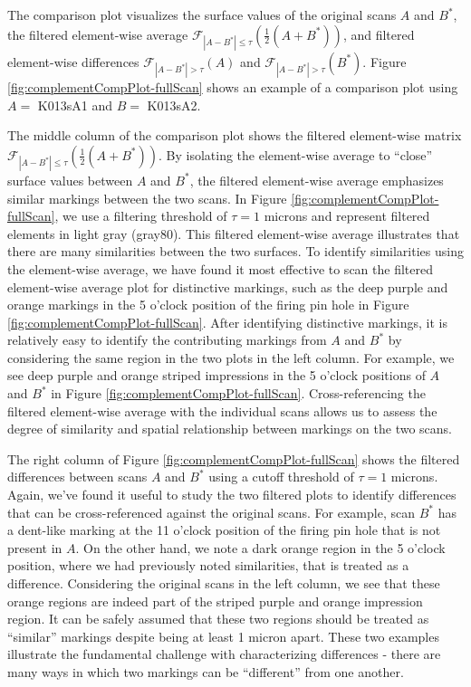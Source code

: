 \documentclass[11pt,]{isuthesis}
\begin{document}
The comparison plot visualizes the surface values of the original scans \(A\) and \(B^*\), the filtered element-wise average \(\mathcal{F}_{|A - B^*| \leq \tau}\left(\frac{1}{2}(A + B^*)\right)\), and filtered element-wise differences \(\mathcal{F}_{|A - B^*| > \tau}(A)\) and \(\mathcal{F}_{|A - B^*| > \tau}(B^*)\).
Figure \ref{fig:complementCompPlot-fullScan} shows an example of a comparison plot using \(A=\) K013sA1 and \(B=\) K013sA2.

The middle column of the comparison plot shows the filtered element-wise matrix \(\mathcal{F}_{|A - B^*| \leq \tau}\left(\frac{1}{2}(A + B^*)\right)\).
By isolating the element-wise average to ``close'' surface values between \(A\) and \(B^*\), the filtered element-wise average emphasizes similar markings between the two scans.
In Figure \ref{fig:complementCompPlot-fullScan}, we use a filtering threshold of \(\tau = 1\) microns and represent filtered elements in light gray (gray80).
This filtered element-wise average illustrates that there are many similarities between the two surfaces.
To identify similarities using the element-wise average, we have found it most effective to scan the filtered element-wise average plot for distinctive markings, such as the deep purple and orange markings in the 5 o'clock position of the firing pin hole in Figure \ref{fig:complementCompPlot-fullScan}.
After identifying distinctive markings, it is relatively easy to identify the contributing markings from \(A\) and \(B^*\) by considering the same region in the two plots in the left column.
For example, we see deep purple and orange striped impressions in the 5 o'clock positions of \(A\) and \(B^*\) in Figure \ref{fig:complementCompPlot-fullScan}.
Cross-referencing the filtered element-wise average with the individual scans allows us to assess the degree of similarity and spatial relationship between markings on the two scans.

The right column of Figure \ref{fig:complementCompPlot-fullScan} shows the filtered differences between scans \(A\) and \(B^*\) using a cutoff threshold of \(\tau = 1\) microns.
Again, we've found it useful to study the two filtered plots to identify differences that can be cross-referenced against the original scans.
For example, scan \(B^*\) has a dent-like marking at the 11 o'clock position of the firing pin hole that is not present in \(A\).
On the other hand, we note a dark orange region in the 5 o'clock position, where we had previously noted similarities, that is treated as a difference.
Considering the original scans in the left column, we see that these orange regions are indeed part of the striped purple and orange impression region.
It can be safely assumed that these two regions should be treated as ``similar'' markings despite being at least 1 micron apart.
These two examples illustrate the fundamental challenge with characterizing differences - there are many ways in which two markings can be ``different'' from one another.
\end{document}
